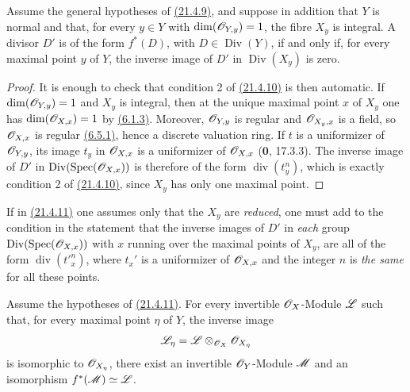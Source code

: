 \begin{corollary}[21.4.11]
\ifdefined\EGAIVSuppressErratumLabels\else\label{IV.21.4.11}\fi
Assume the general hypotheses of {\hyperref[IV.21.4.9]{(21.4.9)}}, and suppose in addition that
$Y$ is normal and that, for every $y\in Y$ with
$\dim(\mathscr{O}_{Y,y})=1$, the fibre $X_y$ is integral.  A divisor $D'$ is
of the form $f^*(D)$, with $D\in\operatorname{Div}(Y)$, if and only if,
for every maximal point $y$ of $Y$, the inverse image of $D'$ in
$\operatorname{Div}(X_y)$ is zero.
\end{corollary}

\begin{proof}
It is enough to check that condition 2\textdegree{} of {\hyperref[IV.21.4.10]{(21.4.10)}} is then
automatic.  If $\dim(\mathscr{O}_{Y,y})=1$ and $X_y$ is integral, then at
the unique maximal point $x$ of $X_y$ one has
$\dim(\mathscr{O}_{X,x})=1$ by {\hyperref[IV.6.1.3]{(6.1.3)}}.  Moreover,
$\mathscr{O}_{Y,y}$ is regular and $\mathscr{O}_{X_y,x}$ is a field, so
$\mathscr{O}_{X,x}$ is regular {\hyperref[IV.6.5.1]{(6.5.1)}}, hence a discrete valuation ring.
If $t$ is a uniformizer of $\mathscr{O}_{Y,y}$, its image $t_y$ in
$\mathscr{O}_{X,x}$ is a uniformizer of $\mathscr{O}_{X,x}$
($\mathbf{0}$, 17.3.3).  The inverse image of $D'$ in
$\operatorname{Div}(\operatorname{Spec}(\mathscr{O}_{X,x}))$ is therefore
of the form $\operatorname{div}(t_y^n)$, which is exactly condition
2\textdegree{} of {\hyperref[IV.21.4.10]{(21.4.10)}}, since $X_y$ has only one maximal point.
\end{proof}

\begin{remark}[21.4.12]
\ifdefined\EGAIVSuppressErratumLabels\else\label{IV.21.4.12}\fi
If in {\hyperref[IV.21.4.11]{(21.4.11)}} one assumes only that the $X_y$ are \emph{reduced}, one must
add to the condition in the statement that the inverse images of $D'$
in \emph{each} group
$\operatorname{Div}(\operatorname{Spec}(\mathscr{O}_{X,x}))$ with $x$
running over the maximal points of $X_y$, are all of the form
$\operatorname{div}(t'^n_x)$, where $t_x'$ is a uniformizer of
$\mathscr{O}_{X,x}$ and the integer $n$ is \emph{the same} for all these points.
\end{remark}

\begin{corollary}[21.4.13]
\ifdefined\EGAIVSuppressErratumLabels\else\label{IV.21.4.13}\fi
Assume the hypotheses of \textup{\hyperref[IV.21.4.11]{(21.4.11)}}.  For every invertible
$\mathscr{O}_X$-Module $\mathscr{L}$ such that, for every maximal point $\eta$ of
$Y$, the inverse image
\[
 \mathscr{L}_\eta
 =\mathscr{L}\otimes_{\mathscr{O}_X}\mathscr{O}_{X_\eta}
\]
is isomorphic to $\mathscr{O}_{X_\eta}$, there exist an invertible
$\mathscr{O}_Y$-Module $\mathscr{M}$ and an isomorphism
$f^*(\mathscr{M})\simeq\mathscr{L}$.
\end{corollary}

